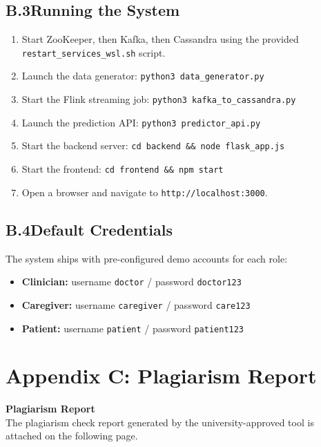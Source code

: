 \documentclass[12pt, a4paper, oneside]{report}
\begin{document}
\section*{B.3\quad Running the System}
\begin{enumerate}
    \item Start ZooKeeper, then Kafka, then Cassandra using the provided \texttt{restart\_services\_wsl.sh} script.
    \item Launch the data generator: \texttt{python3 data\_generator.py}
    \item Start the Flink streaming job: \texttt{python3 kafka\_to\_cassandra.py}
    \item Launch the prediction API: \texttt{python3 predictor\_api.py}
    \item Start the backend server: \texttt{cd backend \&\& node flask\_app.js}
    \item Start the frontend: \texttt{cd frontend \&\& npm start}
    \item Open a browser and navigate to \texttt{http://localhost:3000}.
\end{enumerate}

\section*{B.4\quad Default Credentials}
The system ships with pre-configured demo accounts for each role:
\begin{itemize}
    \item \textbf{Clinician:} username \texttt{doctor} / password \texttt{doctor123}
    \item \textbf{Caregiver:} username \texttt{caregiver} / password \texttt{care123}
    \item \textbf{Patient:} username \texttt{patient} / password \texttt{patient123}
\end{itemize}

\chapter*{Appendix C: Plagiarism Report}

\begin{center}
    \vspace{3cm}
    {\Large \textbf{Plagiarism Report}} \\
    \vspace{1cm}
    {\normalsize The plagiarism check report generated by the university-approved tool is attached on the following page.}
    \vspace{3cm}

\end{center}
\end{document}
